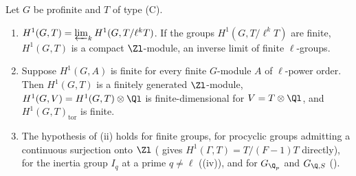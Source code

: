\begin{proposition}\label{prop:cohomology:h1-fg}
Let $G$ be profinite and $T$ of type (C).
\begin{enumerate}[label=(\roman*)]
\item $H^1(G,T)=\varprojlim_kH^1(G,T/\ell^kT)$. If the groups $H^1(G,T/\ell^kT)$ are finite, $H^1(G,T)$ is a compact $\Zl$-module, an inverse limit of finite
$\ell$-groups.
\item Suppose $H^1(G,A)$ is finite for every finite $G$-module $A$ of $\ell$-power order. Then $H^1(G,T)$ is a finitely generated $\Zl$-module,
$H^1(G,V)=H^1(G,T)\otimes\Ql$ is finite-dimensional for $V=T\otimes\Ql$, and $H^1(G,T)_{\mathrm{tor}}$ is finite.
\item The hypothesis of (ii) holds for finite groups, for procyclic groups admitting a continuous surjection onto $\Zl$ (
gives $H^1(\Gamma,T)=T/(F-1)T$ directly), for the inertia group $I_q$ at a prime $q\ne\ell$ ((iv)), and for $G_{\Q_p}$ and $G_{\Q,S}$
().
\end{enumerate}
\end{proposition}

